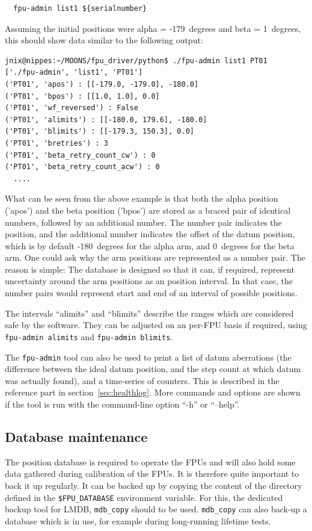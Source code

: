 \documentclass[11pt,a4paper]{scrartcl}
\begin{document}
\begin{verbatim}
  fpu-admin list1 ${serialnumber}
\end{verbatim}

Assuming the initial positions were alpha = -179\degree\ degrees and beta =
1\degree\ degrees, this should show data similar to the following output:

\begin{verbatim}
jnix@nippes:~/MOONS/fpu_driver/python$ ./fpu-admin list1 PT01
['./fpu-admin', 'list1', 'PT01']
('PT01', 'apos') : [[-179.0, -179.0], -180.0]
('PT01', 'bpos') : [[1.0, 1.0], 0.0]
('PT01', 'wf_reversed') : False
('PT01', 'alimits') : [[-180.0, 179.6], -180.0]
('PT01', 'blimits') : [[-179.3, 150.3], 0.0]
('PT01', 'bretries') : 3
('PT01', 'beta_retry_count_cw') : 0
('PT01', 'beta_retry_count_acw') : 0
  ....
\end{verbatim}

What can be seen from the above example is that both the alpha
position ('apos') and the beta position ('bpos') are stored as a
braced pair of identical numbers, followed by an additional
number. The number pair indicates the position, and the additional
number indicates the offset of the datum position, which is by default
-180\degree\ degrees for the alpha arm, and 0\degree\ degrees for the beta arm. One
could ask why the arm positions are represented as a number pair. The
reason is simple: The database is designed so that it can, if
required, represent uncertainty around the arm positions as an
position interval. In that case, the number pairs would represent
start and end of an interval of possible positions.

The intervals ``alimits'' and ``blimits'' describe the ranges which
are considered safe by the software. They can be adjusted on an
per-FPU basis if required, using \texttt{fpu-admin alimits} and
\texttt{fpu-admin blimits}.

The \texttt{fpu-admin} tool can also be used to print a list of datum
aberrations (the difference between the ideal datum position, and the
step count at which datum was actually found), and a time-series of
counters. This is described in the reference part in
section~\ref{sec:healthlog}. More commands and options are shown if the
tool is run with the command-line option ``-h'' or ``--help''.

\subsection{Database maintenance}
The position database is required to operate the FPUs and will also
hold some data gathered during calibration of the FPUs. It is
therefore quite important to back it up regularly.  It can be backed
up by copying the content of the directory defined in the
\verb+$FPU_DATABASE+ environment variable. For this, the dedicated
backup tool for LMDB, \texttt{mdb\_copy} should to be
used. \texttt{mdb\_copy} can also back-up a database which is in use,
for example during long-running lifetime tests.
\end{document}
